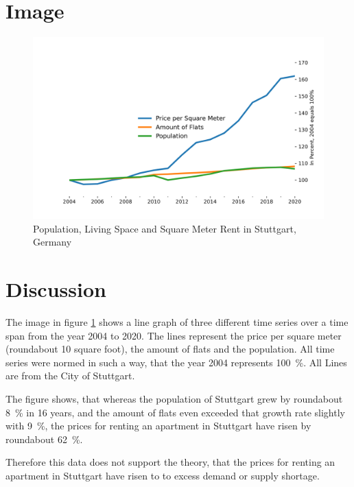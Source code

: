 \documentclass[parskip]{scrartcl}
\begin{document}
\newpage

\section{Image}

\begin{figure}[ht!]
    \includegraphics[width=\textwidth]{population.png}
    \caption{Population, Living Space and Square Meter Rent in Stuttgart, Germany}
    \label{thefigure}
\end{figure}


\section{Discussion}

The image in figure \ref{thefigure} shows a line graph of three different time
series over a time span from the year 2004 to 2020. The lines represent the
price per square meter (roundabout 10 square foot), the amount of flats and the
population. All time series were normed in such a way, that the year 2004
represents 100~\%. All Lines are from the City of Stuttgart.

The figure shows, that whereas the population of Stuttgart grew by roundabout
8~\% in 16 years, and the amount of flats even exceeded that growth rate
slightly with 9~\%, the prices for renting an apartment in Stuttgart have risen
by roundabout 62~\%.

Therefore this data does not support the theory, that the prices for renting an
apartment in Stuttgart have risen to to excess demand or supply shortage.
\end{document}
